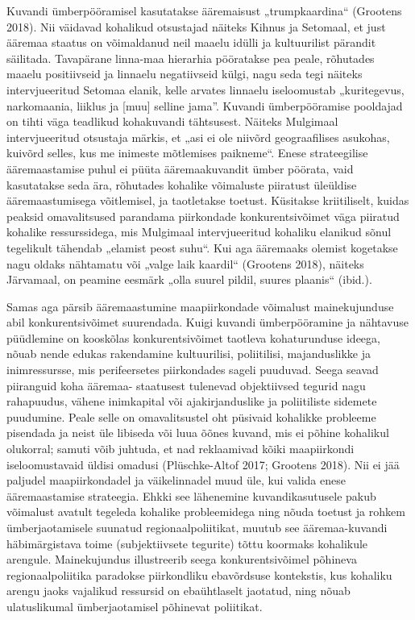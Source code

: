 \documentclass[]{book}
\begin{document}
Kuvandi ümberpööramisel kasutatakse ääremaisust „trumpkaardina`` (Grootens 2018). Nii väidavad
kohalikud otsustajad näiteks Kihnus ja Setomaal, et just ääremaa staatus on võimaldanud neil maaelu idülli
ja kultuurilist pärandit säilitada. Tavapärane linna-maa hierarhia pööratakse pea peale, rõhutades maaelu
positiivseid ja linnaelu negatiivseid külgi, nagu seda tegi näiteks intervjueeritud Setomaa elanik, kelle arvates linnaelu iseloomustab „kuritegevus, narkomaania, liiklus ja {[}muu{]} selline jama''. Kuvandi ümberpööramise pooldajad on tihti väga teadlikud kohakuvandi tähtsusest. Näiteks Mulgimaal intervjueeritud otsustaja märkis, et „asi ei ole niivõrd geograafilises asukohas, kuivõrd selles, kus me inimeste mõtlemises paikneme``. Enese strateegilise ääremaastamise puhul ei püüta ääremaakuvandit ümber pöörata, vaid kasutatakse seda ära, rõhutades kohalike võimaluste piiratust üleüldise ääremaastumisega võitlemisel, ja taotletakse toetust. Küsitakse kriitiliselt, kuidas peaksid omavalitsused parandama piirkondade konkurentsivõimet väga piiratud kohalike ressurssidega, mis Mulgimaal intervjueeritud kohaliku elanikud sõnul tegelikult tähendab „elamist peost suhu``. Kui aga ääremaaks olemist kogetakse nagu oldaks nähtamatu või „valge laik kaardil`` (Grootens 2018), näiteks Järvamaal, on peamine eesmärk „olla suurel pildil, suures plaanis`` (ibid.).

Samas aga pärsib ääremaastumine maapiirkondade võimalust mainekujunduse abil konkurentsivõimet
suurendada. Kuigi kuvandi ümberpööramine ja nähtavuse püüdlemine on kooskõlas konkurentsivõimet
taotleva kohaturunduse ideega, nõuab nende edukas rakendamine kultuurilisi, poliitilisi, majanduslikke ja
inimressursse, mis perifeersetes piirkondades sageli puuduvad. Seega seavad piiranguid koha ääremaa-
staatusest tulenevad objektiivsed tegurid nagu rahapuudus, vähene inimkapital või ajakirjanduslike ja
poliitiliste sidemete puudumine. Peale selle on omavalitsustel oht püsivaid kohalikke probleeme pisendada
ja neist üle libiseda või luua õõnes kuvand, mis ei põhine kohalikul olukorral; samuti võib juhtuda, et nad
reklaamivad kõiki maapiirkondi iseloomustavaid üldisi omadusi (Plüschke-Altof 2017; Grootens 2018). Nii ei
jää paljudel maapiirkondadel ja väikelinnadel muud üle, kui valida enese ääremaastamise strateegia. Ehkki
see lähenemine kuvandikasutusele pakub võimalust avatult tegeleda kohalike probleemidega ning nõuda toetust ja rohkem ümberjaotamisele suunatud regionaalpoliitikat, muutub see ääremaa-kuvandi häbimärgistava toime (subjektiivsete tegurite) tõttu koormaks kohalikule arengule. Mainekujundus illustreerib seega konkurentsivõimel põhineva regionaalpoliitika paradokse piirkondliku ebavõrdsuse
kontekstis, kus kohaliku arengu jaoks vajalikud ressursid on ebaühtlaselt jaotatud, ning nõuab ulatuslikumal
ümberjaotamisel põhinevat poliitikat.
\end{document}
